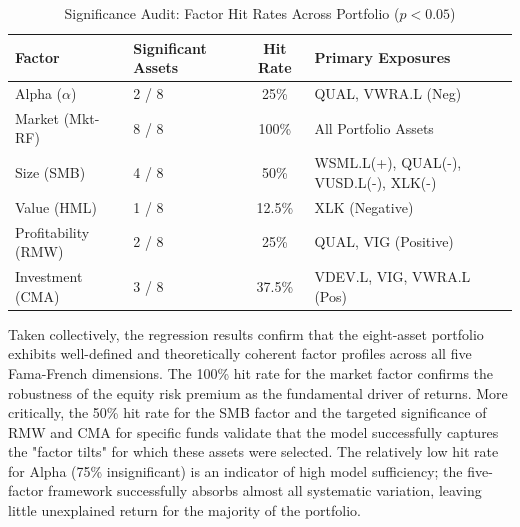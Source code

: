 \documentclass[12pt]{article}
\begin{document}
\begin{table}[htbp]
    \centering
    \caption{Significance Audit: Factor Hit Rates Across Portfolio ($p < 0.05$)}
    \label{tab:significance_audit}
    \begin{tabularx}{\textwidth}{llcX}
        \toprule
        \textbf{Factor} & \textbf{Significant Assets} & \textbf{Hit Rate} & \textbf{Primary Exposures} \\ 
        \midrule
        Alpha ($\alpha$) & 2 / 8 & 25\% & QUAL, VWRA.L (Neg) \\ 
        Market (Mkt-RF)  & 8 / 8 & 100\% & All Portfolio Assets \\ 
        Size (SMB)       & 4 / 8 & 50\% & WSML.L(+), QUAL(-), VUSD.L(-), XLK(-) \\ 
        Value (HML)      & 1 / 8 & 12.5\% & XLK (Negative) \\ 
        Profitability (RMW) & 2 / 8 & 25\% & QUAL, VIG (Positive) \\ 
        Investment (CMA)    & 3 / 8 & 37.5\% & VDEV.L, VIG, VWRA.L (Pos) \\ 
        \bottomrule
    \end{tabularx}
\end{table}

Taken collectively, the regression results confirm that the eight-asset portfolio exhibits well-defined and theoretically coherent factor profiles across all five Fama-French dimensions. The 100\% hit rate for the market factor confirms the robustness of the equity risk premium as the fundamental driver of returns. More critically, the 50\% hit rate for the SMB factor and the targeted significance of RMW and CMA for specific funds validate that the model successfully captures the "factor tilts" for which these assets were selected. The relatively low hit rate for Alpha (75\% insignificant) is an indicator of high model sufficiency; the five-factor framework successfully absorbs almost all systematic variation, leaving little unexplained return for the majority of the portfolio.
\end{document}

